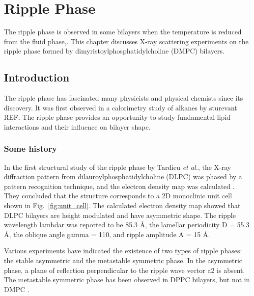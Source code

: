 \chapter{Ripple Phase}\label{chap:ripple}
The ripple phase is observed in some bilayers
when the temperature is reduced from the fluid phase,.
This chapter discusses X-ray scattering experiments on the ripple phase 
formed by dimyristoylphosphatidylcholine (\gls{DMPC}) bilayers. 

\section{Introduction}\label{sec:ripple_introduction}
The ripple phase has fascinated many physicists 
and physical chemists since its discovery. It was first observed in a
calorimetry study of alkanes by sturevant {\jn REF}. 
The ripple phase provides an opportunity
to study fundamental lipid interactions and their influence on bilayer 
shape. 

\subsection{Some history}
In the first structural study of the ripple phase by Tardieu \textit{et al.},
the X-ray diffraction pattern from dilauroylphosphatidylcholine (\gls{DLPC}) was phased 
by a pattern recognition technique, and the electron density map was calculated
\cite{ref:Tardieu73}. 
They concluded that the structure
corresponds to a 2D monoclinic unit cell shown in Fig.~\ref{fig:unit_cell}.
The calculated 
electron density map showed that DLPC bilayers are height modulated
and have asymmetric shape. 
The ripple wavelength \gls{lambdar} was reported to be 85.3 \AA, 
the lamellar periodicity \gls{D} = 55.3 \AA, the oblique angle
\gls{gamma} = 110\textdegree, and ripple amplitude \gls{A} = 15 \AA.

Various experiments have indicated the existence of two types of ripple phases:
the stable asymmetric and the metastable symmetric phase. In the asymmetric
phase, a plane of reflection perpendicular to the ripple wave vector \gls{a2}
is absent. 
The metastable symmetric phase has been observed in DPPC bilayers, but not
in DMPC \cite{ref:Katsaras00}.

